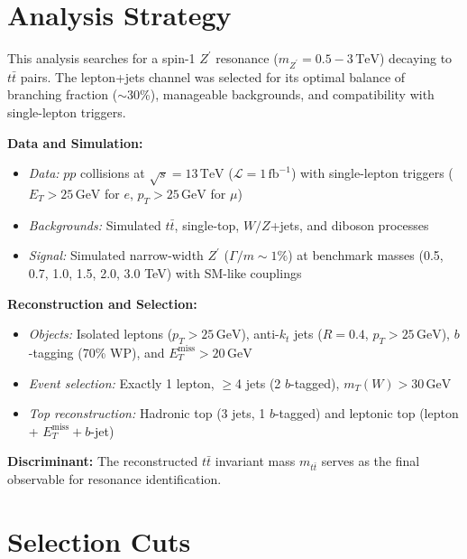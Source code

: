 
\section{Analysis Strategy}
This analysis searches for a spin-1 \(Z^{\prime}\) resonance (\(m_{Z^{\prime}} = 0.5-3\,\mathrm{TeV}\)) decaying to \(t\bar{t}\) pairs. The lepton+jets channel was selected for its optimal balance of branching fraction (\(\sim\)30\%), manageable backgrounds, and compatibility with single-lepton triggers. 

\textbf{Data and Simulation:}
\begin{itemize}
    \item \textit{Data:} \(pp\) collisions at \(\sqrt{s} = 13\,\mathrm{TeV}\) (\( \mathcal{L} = 1\,\mathrm{fb}^{-1}\)) with single-lepton triggers (\(E_T > 25\,\mathrm{GeV}\) for \(e\), \(p_T > 25\,\mathrm{GeV}\) for \(\mu\))
    \item \textit{Backgrounds:} Simulated \(t\bar{t}\), single-top, \(W/Z\)+jets, and diboson processes
    \item \textit{Signal:} Simulated narrow-width \(Z^{\prime}\) (\( \Gamma/m \sim 1\%\)) at benchmark masses (0.5, 0.7, 1.0, 1.5, 2.0, 3.0 TeV) with SM-like couplings
\end{itemize}

\textbf{Reconstruction and Selection:}
\begin{itemize}
    \item \textit{Objects:} Isolated leptons (\(p_T > 25\,\mathrm{GeV}\)), anti-\(k_t\) jets (\(R=0.4\), \(p_T > 25\,\mathrm{GeV}\)), \(b\)-tagging (70\% WP), and \(E_T^{\mathrm{miss}} > 20\,\mathrm{GeV}\)
    \item \textit{Event selection:} Exactly 1 lepton, \(\geq\)4 jets (2 \(b\)-tagged), \(m_T(W) > 30\,\mathrm{GeV}\)
    \item \textit{Top reconstruction:} Hadronic top (3 jets, 1 \(b\)-tagged) and leptonic top (lepton + \(E_T^{\mathrm{miss}} + b\)-jet)
\end{itemize}

\textbf{Discriminant:} The reconstructed \(t\bar{t}\) invariant mass \(m_{t\bar{t}}\) serves as the final observable for resonance identification.

\section{Selection Cuts}

